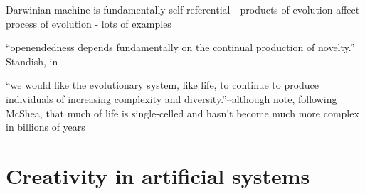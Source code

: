 \begin{DRAFT}
Darwinian machine is fundamentally self-referential - products of evolution affect process of evolution - lots of examples \parencite{Watson2015}

``openendedness depends fundamentally on the continual production of novelty.'' Standish, in \parencite{Soros2014}

``we would like the evolutionary system, like life, to continue to produce individuals of increasing complexity and diversity.''--although note, following McShea, that much of life is single-celled and hasn't become much more complex in billions of years \parencite{Maley1999}

\end{DRAFT}

\section{Creativity in artificial systems}\label{creativity}

